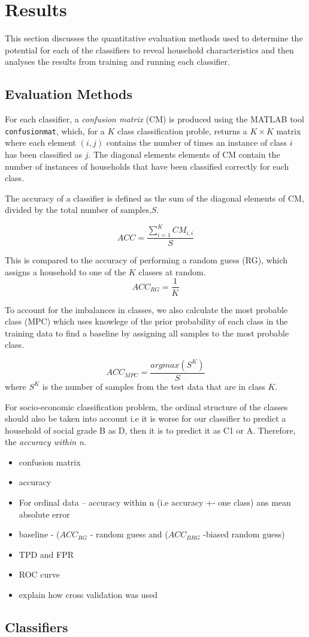 \chapter{Results}

This section discusses the quantitative evaluation methods used to determine the potential for each of the classifiers to reveal household characteristics and then analyses the results from training and running each classifier.

\section{Evaluation Methods}

For each classifier, a \textit{confusion matrix} (CM) is produced using the MATLAB tool \texttt{confusionmat}, which, for a $K$ class classification proble, returns a $K\times K$ matrix where each element $(i,j)$ contains the number of times an instance of class $i$ has been classified as $j$. The diagonal elements elements of CM contain the number of instances of households that have been classified correctly for each class. \cite{Stefanowski}


The accuracy of a classifier is defined as the sum of the diagonal elements of CM, divided by the total number of samples,$S$.

\[ACC=\frac{\sum_{i=1}^KCM_{i,i}}{S}\]

This is compared to the accuracy of performing a random guess (RG), which assigns a household to one of the $K$ classes at random.
\[ACC_{RG}=\frac{1}{K}\]

To account for the imbalances in classes, we also calculate the most probable class (MPC) which uses knowlege of the prior probability of each class in the training data to find a baseline by assigning all samples to the most probable class. 

\[ACC_{MPC}=\frac{argmax(S^K)}{S}\]
where $S^K$ is the number of samples from the test data that are in class $K$.

\bigskip

For socio-economic classification problem, the ordinal structure of the classes should also be taken into account i.e it is worse for our classifier to predict a household of social grade B as D, then it is to predict it as C1 or A. Therefore, the \textit{accuracy within n}\cite{Gaudette}. 





\begin{itemize}
\item confusion matrix
\item accuracy
\item For ordinal data -- accuracy within n (i.e accuracy +- one class) ans mean absolute error 
\item baseline - ($ACC_{RG}$ - random guess and ($ACC_{BRG}$ -biased random guess)
\item TPD and FPR
\item ROC curve
\item explain how cross validation was used
\end{itemize}


\section{Classifiers}